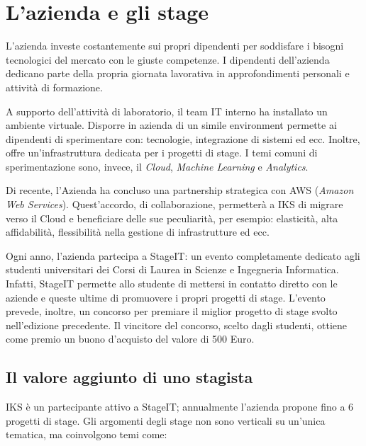 
\chapter{L'azienda e gli stage}
\label{cap:stage}
\vspace{20pt}
L'azienda investe costantemente sui propri dipendenti per soddisfare 
i bisogni tecnologici del mercato con le giuste competenze. 
I dipendenti dell'azienda dedicano parte della propria giornata lavorativa 
in approfondimenti personali e attività di formazione. 

A supporto dell'attività di laboratorio, il team IT interno ha installato 
un ambiente virtuale. Disporre in azienda di un simile environment permette 
ai dipendenti di sperimentare con: tecnologie, integrazione di sistemi ed ecc. 
Inoltre, offre un'infrastruttura dedicata per i progetti di stage. I temi 
comuni di sperimentazione sono, invece, il  \textit{Cloud}, 
\textit{Machine Learning} e \textit{Analytics}. 

Di recente, l'Azienda ha concluso una partnership strategica con AWS 
(\textit{Amazon Web Services}). Quest'accordo, di collaborazione, 
permetterà a IKS di migrare verso il Cloud e beneficiare delle sue 
peculiarità, per esempio: elasticità, alta affidabilità, flessibilità 
nella gestione di infrastrutture ed ecc. 

Ogni anno, l'azienda partecipa a StageIT: un evento completamente dedicato 
agli studenti universitari dei Corsi di Laurea in Scienze e Ingegneria 
Informatica.
Infatti, StageIT permette  allo studente di mettersi in contatto diretto 
con le aziende e queste ultime di promuovere i propri progetti di stage. 
L'evento prevede, inoltre, un concorso per premiare il miglior progetto 
di stage svolto nell'edizione precedente. Il vincitore del concorso, 
scelto dagli studenti, ottiene come premio un buono d'acquisto del 
valore di 500 Euro.

\section{Il valore aggiunto di uno stagista}

IKS è un partecipante attivo a StageIT; annualmente l'azienda propone 
fino a 6 progetti di stage. Gli argomenti degli stage non sono verticali 
su un'unica tematica, ma coinvolgono temi come: 

